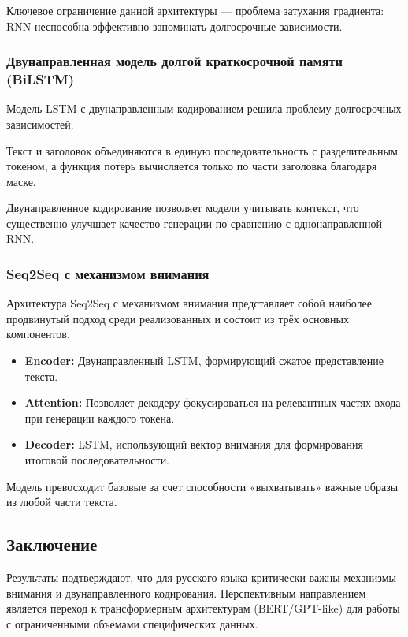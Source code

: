 \documentclass[coursework]{SCWorks}
\begin{document}
    Ключевое ограничение данной архитектуры — проблема затухания градиента: RNN неспособна эффективно
    запоминать долгосрочные зависимости.

    \subsubsection{Двунаправленная модель долгой краткосрочной памяти (BiLSTM)}

    Модель LSTM с двунаправленным кодированием решила проблему долгосрочных зависимостей.

    Текст и заголовок объединяются в единую последовательность с разделительным токеном, а функция потерь
    вычисляется только по части заголовка благодаря маске.

    Двунаправленное кодирование позволяет модели учитывать контекст, что существенно улучшает качество генерации по сравнению
    с однонаправленной RNN.

    \subsubsection{Seq2Seq с механизмом внимания}

    Архитектура Seq2Seq с механизмом внимания представляет собой наиболее продвинутый подход среди реализованных и состоит
    из трёх основных компонентов.

    \begin{itemize}

        \item \textbf{Encoder:} Двунаправленный LSTM, формирующий сжатое представление текста.

        \item \textbf{Attention:} Позволяет декодеру фокусироваться на релевантных частях входа при генерации каждого токена.

        \item \textbf{Decoder:} LSTM, использующий вектор внимания для формирования итоговой последовательности.

    \end{itemize}

    Модель превосходит базовые за счет способности «выхватывать» важные образы из любой части текста.

    \subsection{Заключение}

    Результаты подтверждают, что для русского языка критически важны механизмы внимания и двунаправленного кодирования.
    Перспективным направлением является переход к трансформерным архитектурам (BERT/GPT-like)
    для работы с ограниченными объемами специфических данных.
\end{document}
